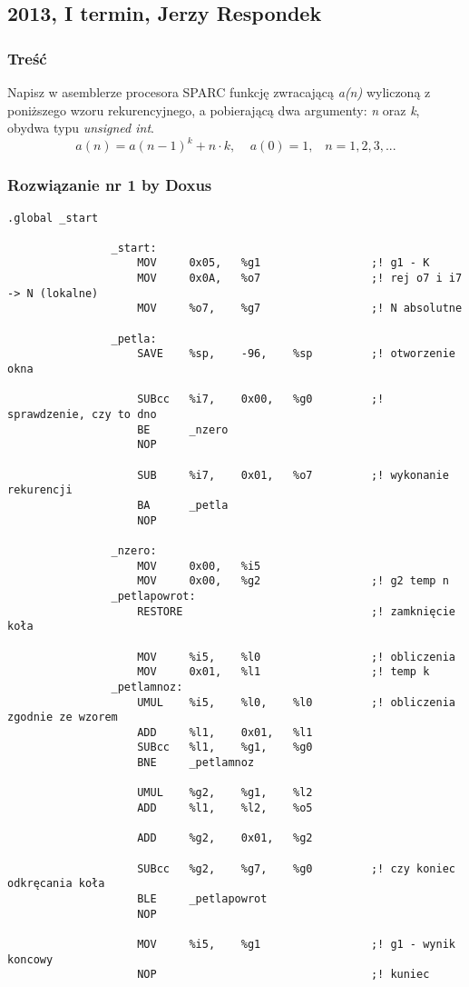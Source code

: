 	\newpage
	\subsection{2013, I termin, Jerzy Respondek}
		\subsubsection{Treść}
			Napisz w asemblerze procesora SPARC funkcję zwracającą \emph{a(n)} wyliczoną z poniższego wzoru rekurencyjnego, a pobierającą dwa argumenty: \emph{n} oraz \emph{k}, obydwa typu \textit{unsigned int}.
			$$ a(n)=a(n-1)^k+n\cdot k,\;\;\;\;a(0)=1,\;\;\;n=1,2,3,... $$
		\subsubsection{Rozwiązanie nr 1 by Doxus}
			\begin{lstlisting}[language={[sparc]Assembler}]
				.global _start
				
				_start:
					MOV		0x05,	%g1					;! g1 - K
					MOV		0x0A,	%o7					;! rej o7 i i7 -> N (lokalne)
					MOV		%o7,	%g7					;! N absolutne
				
				_petla:
					SAVE	%sp,	-96,	%sp			;! otworzenie okna
				
					SUBcc	%i7,	0x00,	%g0			;! sprawdzenie, czy to dno
					BE		_nzero
					NOP
					
					SUB		%i7,	0x01,	%o7			;! wykonanie rekurencji
					BA		_petla
					NOP
					
				_nzero:
					MOV		0x00,	%i5
					MOV		0x00,	%g2					;! g2 temp n
				_petlapowrot:
					RESTORE								;! zamknięcie koła
					
					MOV		%i5,	%l0					;! obliczenia
					MOV		0x01,	%l1					;! temp k
				_petlamnoz:
					UMUL	%i5,	%l0,	%l0			;! obliczenia zgodnie ze wzorem
					ADD		%l1,	0x01,	%l1
					SUBcc	%l1,	%g1,	%g0
					BNE		_petlamnoz
					
					UMUL	%g2,	%g1,	%l2
					ADD		%l1,	%l2,	%o5
				
					ADD		%g2,	0x01,	%g2
					
					SUBcc	%g2,	%g7,	%g0			;! czy koniec odkręcania koła
					BLE		_petlapowrot
					NOP
				
					MOV		%i5,	%g1					;! g1 - wynik koncowy
					NOP									;! kuniec
			\end{lstlisting}
		\newpage
